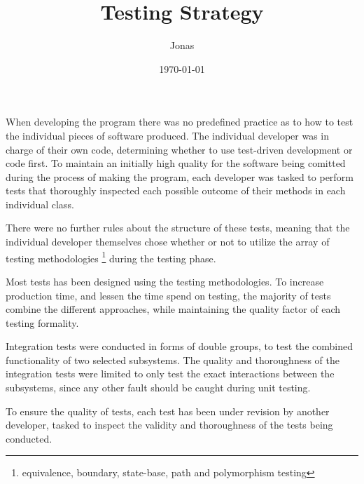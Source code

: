 \documentclass[12pt,a4paper] {report}
\author{Jonas}
\title{Testing Strategy}
\date{\today}
\begin{document}
	\long{}
	\maketitle
	
	
	When developing the program there was no predefined practice as to how to test the individual pieces of software produced. The individual developer was in charge of their own code, determining whether to use test-driven development or code first.
	To maintain an initially high quality for the software being comitted during the process of making the program, each developer was tasked to perform tests that thoroughly inspected each possible outcome of their methods in each individual class.
	
	There were no further rules about the structure of these tests, meaning that the individual developer themselves chose whether or not to utilize the array of testing methodologies \footnote{equivalence, boundary, state-base, path and polymorphism testing} during the testing phase.
	
	Most tests has been designed using the testing methodologies. To increase production time, and lessen the time spend on testing, the majority of tests combine the different approaches, while maintaining the quality factor of each testing formality.

	Integration tests were conducted in forms of double groups, to test the combined functionality of two selected subsystems. The quality and thoroughness of the integration tests were limited to only test the exact interactions between the subsystems, since any other fault should be caught during unit testing.
	
	To ensure the quality of tests, each test has been under revision by another developer, tasked to inspect the validity and thoroughness of the tests being conducted.
	
	
\end{document}
